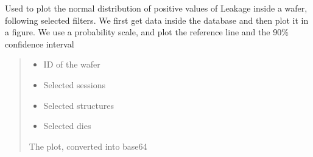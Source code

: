 \documentclass[letterpaper,10pt,english]{sphinxmanual}
\begin{document}
\begin{fulllineitems}
\label{\detokenize{normal_plots:normal_plots.Leakage_normal_distrib_pos}}
\pysigstartsignatures
{}
\pysigstopsignatures
\sphinxAtStartPar
Used to plot the normal distribution of positive values of Leakage inside a wafer, following selected filters.
We first get data inside the database and then plot it in a figure. We use a probability scale, and plot the reference line and the 90\% confidence interval
\begin{quote}\begin{description}
\begin{itemize}
\item {} 
\sphinxAtStartPar
{} \textendash{} ID of the wafer

\item {} 
\sphinxAtStartPar
{} \textendash{} Selected sessions

\item {} 
\sphinxAtStartPar
{} \textendash{} Selected structures

\item {} 
\sphinxAtStartPar
{} \textendash{} Selected dies

\end{itemize}

\sphinxAtStartPar
The plot, converted into base64

\end{description}\end{quote}

\end{fulllineitems}

\end{document}
